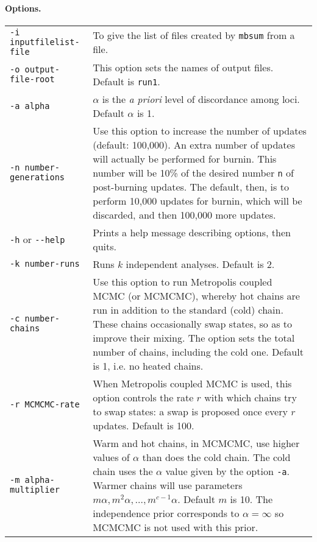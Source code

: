 \documentclass[12pt,english,final,letterpaper]{article}
\begin{document}
\paragraph{Options.} \hspace{1cm}

\bigskip

\noindent
\hspace*{-.2in}
\begin{tabular}{l|p{4.6in}}
{\tt -i inputfilelist-file}&To give the list of files created by {\tt mbsum} 
from a file.\\
{\tt -o output-file-root}&This option sets the names of output 
files. Default is {\tt run1}.\\
{\tt -a alpha}&$\alpha$ is the {\it a priori} level of discordance among 
loci. Default $\alpha$ is 1.\\
{\tt -n number-generations}&Use this option to increase the number of 
updates (default: 100,000). An extra number of updates will actually be 
performed for burnin. This number will be 10\% of the desired number {\tt n} 
of post-burning updates. The default, then, is to perform 10,000 updates for 
burnin, which will be discarded, and then 100,000 more updates.\\
{\tt -h} or \verb+--help+&Prints a help message describing options,
then quits.\\
{\tt -k number-runs}&Runs $k$ independent analyses. Default is 2.\\
{\tt -c number-chains}&Use this option to run Metropolis coupled MCMC (or MCMCMC), 
whereby hot chains are run in addition to the standard (cold) chain. 
These chains occasionally swap states, so as to improve their mixing. 
The option sets the total number of chains, including the cold one. 
Default is 1, i.e. no heated chains.\\
{\tt -r MCMCMC-rate}&When Metropolis coupled MCMC is used, this option
controls the rate $r$ with which chains try to swap states: a swap
is proposed once every $r$ updates. Default is 100.\\
{\tt -m alpha-multiplier}&Warm and hot chains, in MCMCMC, use higher values 
of $\alpha$ than does the cold chain. The cold chain uses the $\alpha$ value 
given by the option {\tt -a}. Warmer chains will use parameters 
$m\alpha, m^2\alpha,\dots, m^{c-1}\alpha$. Default $m$ is 10.
The independence prior corresponds to $\alpha=\infty$ so MCMCMC is not used
with this prior.
\end{tabular}
\end{document}

